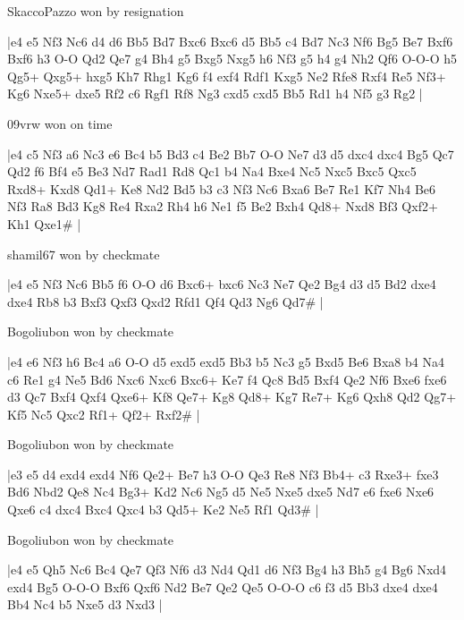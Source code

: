 \showboard

SkaccoPazzo won by resignation

\makegametitle
|e4 e5 Nf3 Nc6 d4 d6 Bb5 Bd7 Bxc6 Bxc6 d5 Bb5 c4 Bd7 Nc3 Nf6 Bg5 Be7 Bxf6 Bxf6 h3 O-O Qd2 Qe7 g4 Bh4 g5 Bxg5 Nxg5 h6 Nf3 g5 h4 g4 Nh2 Qf6 O-O-O h5 Qg5+ Qxg5+ hxg5 Kh7 Rhg1 Kg6 f4 exf4 Rdf1 Kxg5 Ne2 Rfe8 Rxf4 Re5 Nf3+ Kg6 Nxe5+ dxe5 Rf2 c6 Rgf1 Rf8 Ng3 cxd5 cxd5 Bb5 Rd1 h4 Nf5 g3 Rg2  |

\showboard

09vrw won on time

\makegametitle
|e4 c5 Nf3 a6 Nc3 e6 Bc4 b5 Bd3 c4 Be2 Bb7 O-O Ne7 d3 d5 dxc4 dxc4 Bg5 Qc7 Qd2 f6 Bf4 e5 Be3 Nd7 Rad1 Rd8 Qc1 b4 Na4 Bxe4 Nc5 Nxc5 Bxc5 Qxc5 Rxd8+ Kxd8 Qd1+ Ke8 Nd2 Bd5 b3 c3 Nf3 Nc6 Bxa6 Be7 Re1 Kf7 Nh4 Be6 Nf3 Ra8 Bd3 Kg8 Re4 Rxa2 Rh4 h6 Ne1 f5 Be2 Bxh4 Qd8+ Nxd8 Bf3 Qxf2+ Kh1 Qxe1\#  |

\showboard

shamil67 won by checkmate

\makegametitle
|e4 e5 Nf3 Nc6 Bb5 f6 O-O d6 Bxc6+ bxc6 Nc3 Ne7 Qe2 Bg4 d3 d5 Bd2 dxe4 dxe4 Rb8 b3 Bxf3 Qxf3 Qxd2 Rfd1 Qf4 Qd3 Ng6 Qd7\#  |

\showboard

Bogoliubon won by checkmate

\makegametitle
|e4 e6 Nf3 h6 Bc4 a6 O-O d5 exd5 exd5 Bb3 b5 Nc3 g5 Bxd5 Be6 Bxa8 b4 Na4 c6 Re1 g4 Ne5 Bd6 Nxc6 Nxc6 Bxc6+ Ke7 f4 Qc8 Bd5 Bxf4 Qe2 Nf6 Bxe6 fxe6 d3 Qc7 Bxf4 Qxf4 Qxe6+ Kf8 Qe7+ Kg8 Qd8+ Kg7 Re7+ Kg6 Qxh8 Qd2 Qg7+ Kf5 Nc5 Qxc2 Rf1+ Qf2+ Rxf2\#  |

\showboard

Bogoliubon won by checkmate

\makegametitle
|e3 e5 d4 exd4 exd4 Nf6 Qe2+ Be7 h3 O-O Qe3 Re8 Nf3 Bb4+ c3 Rxe3+ fxe3 Bd6 Nbd2 Qe8 Nc4 Bg3+ Kd2 Nc6 Ng5 d5 Ne5 Nxe5 dxe5 Nd7 e6 fxe6 Nxe6 Qxe6 c4 dxc4 Bxc4 Qxc4 b3 Qd5+ Ke2 Ne5 Rf1 Qd3\#  |

\showboard

Bogoliubon won by checkmate

\makegametitle
|e4 e5 Qh5 Nc6 Bc4 Qe7 Qf3 Nf6 d3 Nd4 Qd1 d6 Nf3 Bg4 h3 Bh5 g4 Bg6 Nxd4 exd4 Bg5 O-O-O Bxf6 Qxf6 Nd2 Be7 Qe2 Qe5 O-O-O c6 f3 d5 Bb3 dxe4 dxe4 Bb4 Nc4 b5 Nxe5 d3 Nxd3  |

